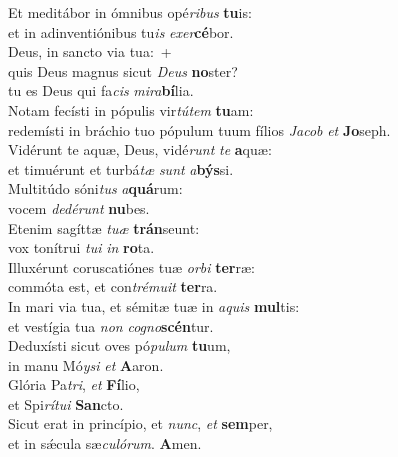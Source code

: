 \evenverse Et meditábor in ómnibus opé\textit{ri}\textit{bus} \textbf{tu}is:~\*\\
\evenverse et in adinventiónibus tu\textit{is} \textit{e}\textit{xer}\textbf{cé}bor.\\
\oddverse Deus, in sancto via tua:~+\\
\oddverse  quis Deus magnus sicut \textit{De}\textit{us} \textbf{no}ster?~\*\\
\oddverse tu es Deus qui fa\textit{cis} \textit{mi}\textit{ra}\textbf{bí}lia.\\
\evenverse Notam fecísti in pópulis vir\textit{tú}\textit{tem} \textbf{tu}am:~\*\\
\evenverse redemísti in bráchio tuo pópulum tuum fílios \textit{Ja}\textit{cob} \textit{et} \textbf{Jo}seph.\\
\oddverse Vidérunt te aquæ, Deus, vidé\textit{runt} \textit{te} \textbf{a}quæ:~\*\\
\oddverse et timuérunt et turbá\textit{tæ} \textit{sunt} \textit{a}\textbf{býs}si.\\
\evenverse Multitúdo sóni\textit{tus} \textit{a}\textbf{quá}rum:~\*\\
\evenverse vocem \textit{de}\textit{dé}\textit{runt} \textbf{nu}bes.\\
\oddverse Etenim sagíttæ \textit{tu}\textit{æ} \textbf{trán}seunt:~\*\\
\oddverse vox tonítrui \textit{tu}\textit{i} \textit{in} \textbf{ro}ta.\\
\evenverse Illuxérunt coruscatiónes tuæ \textit{or}\textit{bi} \textbf{ter}ræ:~\*\\
\evenverse commóta est, et con\textit{tré}\textit{mu}\textit{it} \textbf{ter}ra.\\
\oddverse In mari via tua, et sémitæ tuæ in \textit{a}\textit{quis} \textbf{mul}tis:~\*\\
\oddverse et vestígia tua \textit{non} \textit{co}\textit{gno}\textbf{scén}tur.\\
\evenverse Deduxísti sicut oves pó\textit{pu}\textit{lum} \textbf{tu}um,~\*\\
\evenverse in manu Mó\textit{y}\textit{si} \textit{et} \textbf{A}aron.\\
\oddverse Glória Pa\textit{tri}, \textit{et} \textbf{Fí}lio,~\*\\
\oddverse et Spi\textit{rí}\textit{tu}\textit{i} \textbf{San}cto.\\
\evenverse Sicut erat in princípio, et \textit{nunc}, \textit{et} \textbf{sem}per,~\*\\
\evenverse et in sǽcula sæ\textit{cu}\textit{ló}\textit{rum}. \textbf{A}men.\\

